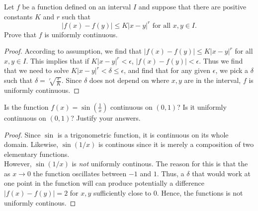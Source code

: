 \documentclass[12pt]{book}
\newenvironment{exercise}[2][Exercise]{\begin{trivlist}
\item[\hskip \labelsep {\bfseries #1}\hskip \labelsep {\bfseries #2.}]}{\end{trivlist}}
\begin{document}
\begin{exercise}{3.3.8}
Let $f$ be a function defined on an interval $I$ and suppose that there are positive constants $K$ and $r$ such that
	\[ |f(x)-f(y)| \leq K |x-y|^r \text{ for all } x,y \in I. \]
Prove that $f$ is uniformly continuous.

	\begin{proof}
	According to assumption, we find that $|f(x)-f(y)| \leq K |x-y|^r$ for all $x,y \in I$. This implies that if $K | x-y|^r < \epsilon$, $|f(x)-f(y)|<\epsilon$. Thus we find that we need to solve $K |x-y|^r < \delta \leq \epsilon$, and find that for any given $\epsilon$, we pick a $\delta$ such that $\delta = \sqrt[r]{\frac{\epsilon}{K}}$. Since $\delta$ does not depend on where $x,y$ are in the interval, $f$ is uniformly continuous.
	\end{proof}
\end{exercise}



\begin{exercise}{3.3.9}
Is the function $f(x)=\sin(\frac{1}{x})$ continuous on $(0,1)$? Is it uniformly continuous on $(0,1)$? Justify your answers.

	\begin{proof}
	Since $\sin$ is a trigonometric function, it is continuous on its whole domain. Likewise, $\sin(1/x)$ is continous since it is merely a composition of two elementary functions. \\
	However, $\sin(1/x)$ is \emph{not} uniformly continous. The reason for this is that the as $x \to 0$ the function oscillates between $-1$ and $1$. Thus, a $\delta$ that would work at one point in the function will can produce potentially a difference $|f(x)-f(y)|=2$ for $x,y$ sufficiently close to 0. Hence, the functions is not uniformly continous.
	\end{proof}
\end{exercise}
\end{document}
